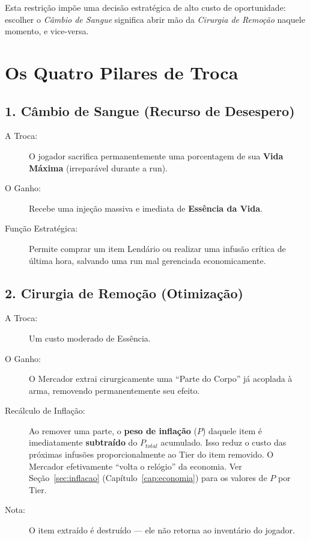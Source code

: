 \documentclass[a4paper,12pt]{report}
\begin{document}
Esta restrição impõe uma decisão estratégica de alto custo de oportunidade: escolher o \textit{Câmbio de Sangue} significa abrir mão da \textit{Cirurgia de Remoção} naquele momento, e vice-versa.

\section{Os Quatro Pilares de Troca}

\subsection{1. Câmbio de Sangue (Recurso de Desespero)}
\begin{description}
    \item[A Troca:] O jogador sacrifica permanentemente uma porcentagem de sua \textbf{Vida Máxima} (irreparável durante a run).
    \item[O Ganho:] Recebe uma injeção massiva e imediata de \textbf{Essência da Vida}.
    \item[Função Estratégica:] Permite comprar um item Lendário ou realizar uma infusão crítica de última hora, salvando uma run mal gerenciada economicamente.
\end{description}

\subsection{2. Cirurgia de Remoção (Otimização)}
\begin{description}
    \item[A Troca:] Um custo moderado de Essência.
    \item[O Ganho:] O Mercador extrai cirurgicamente uma ``Parte do Corpo'' já acoplada à arma, removendo permanentemente seu efeito.
    \item[Recálculo de Inflação:] Ao remover uma parte, o \textbf{peso de inflação} ($P$) daquele item é imediatamente \textbf{subtraído} do $P_{total}$ acumulado. Isso reduz o custo das próximas infusões proporcionalmente ao Tier do item removido. O Mercador efetivamente ``volta o relógio'' da economia. Ver Seção~\ref{sec:inflacao} (Capítulo~\ref{cap:economia}) para os valores de $P$ por Tier.
    \item[Nota:] O item extraído é destruído — ele não retorna ao inventário do jogador.
\end{description}
\end{document}
